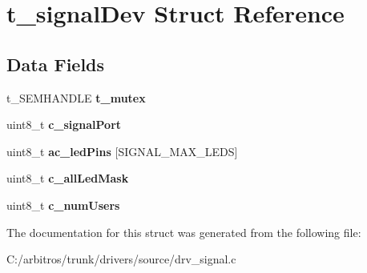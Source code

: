 \hypertarget{structt__signal_dev}{\section{t\-\_\-signal\-Dev Struct Reference}
\label{structt__signal_dev}
}
\subsection*{Data Fields}
\begin{DoxyCompactItemize}
\item 
\hypertarget{structt__signal_dev_ab0543e5662ae0b4ef5014d2c76ab248d}{t\-\_\-\-S\-E\-M\-H\-A\-N\-D\-L\-E {\bfseries t\-\_\-mutex}}\label{structt__signal_dev_ab0543e5662ae0b4ef5014d2c76ab248d}

\item 
\hypertarget{structt__signal_dev_af86ceff59c114aae4c7c767e0dde8632}{uint8\-\_\-t {\bfseries c\-\_\-signal\-Port}}\label{structt__signal_dev_af86ceff59c114aae4c7c767e0dde8632}

\item 
\hypertarget{structt__signal_dev_a1384b15b1062ab123f76726b7bf78cfc}{uint8\-\_\-t {\bfseries ac\-\_\-led\-Pins} \mbox{[}S\-I\-G\-N\-A\-L\-\_\-\-M\-A\-X\-\_\-\-L\-E\-D\-S\mbox{]}}\label{structt__signal_dev_a1384b15b1062ab123f76726b7bf78cfc}

\item 
\hypertarget{structt__signal_dev_abffdf702c0b4b767697b9af5680c4c67}{uint8\-\_\-t {\bfseries c\-\_\-all\-Led\-Mask}}\label{structt__signal_dev_abffdf702c0b4b767697b9af5680c4c67}

\item 
\hypertarget{structt__signal_dev_a65907c8d88006e5cdc5e6b18eb4606ba}{uint8\-\_\-t {\bfseries c\-\_\-num\-Users}}\label{structt__signal_dev_a65907c8d88006e5cdc5e6b18eb4606ba}

\end{DoxyCompactItemize}


The documentation for this struct was generated from the following file\-:\begin{DoxyCompactItemize}
\item 
C\-:/arbitros/trunk/drivers/source/drv\-\_\-signal.\-c\end{DoxyCompactItemize}
